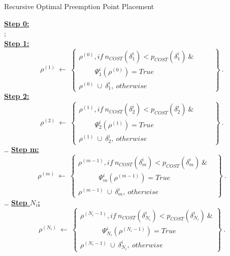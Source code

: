 \begin{algorithm}
\caption*{Recursive Optimal Preemption Point Placement}
\label{alg:recursive-optimal-ppp}
\begin{algorithmic}[0]
\State \textbf{\underline{Step 0:}}
\\
;
\\
\State \textbf{\underline{Step 1:}}
\begin{equation*}
\rho^{(1)}\ \gets\
\left\{
\begin{array}{l}
    \rho^{(0)}, if\ n_{COST}(\delta_{1}^{i}) < p_{COST}(\delta_{1}^{i})\ \&\ \ \ \ \ \ \ \ \ \ \ \\
    \ \ \ \ \ \ \ \ \ \ \Psi_{1}^{i}(\rho^{(0)}) = True\\
    \rho^{(0)}\ \cup\ \delta_{1}^{i},\ otherwise
\end{array}
\right\}~.
\end{equation*}
\State \textbf{\underline{Step 2:}}
\begin{equation*}
\rho^{(2)}\ \gets\
\left\{
\begin{array}{l}
    \rho^{(1)}, if\ n_{COST}(\delta_{2}^{i}) < p_{COST}(\delta_{2}^{i})\ \&\ \ \ \ \ \ \ \ \ \ \ \\
    \ \ \ \ \ \ \ \ \ \ \Psi_{2}^{i}(\rho^{(1)}) = True\\
    \rho^{(1)}\ \cup\ \delta_{2}^{i},\ otherwise
\end{array}
\right\}~.
\end{equation*}
\ldots
\State \textbf{\underline{Step m:}}
\begin{equation*}
\rho^{(m)}\ \gets\
\left\{
\begin{array}{l}
    \rho^{(m-1)}, if\ n_{COST}(\delta_{m}^{i}) < p_{COST}(\delta_{m}^{i})\ \&\ \ \ \ \\
    \ \ \ \ \ \ \ \ \ \ \ \ \ \Psi_{m}^{i}(\rho^{(m-1)}) = True\\
    \rho^{(m-1)}\ \cup\ \delta_{m}^{i},\ otherwise
\end{array}
\right\}~.
\end{equation*}
\ldots
\State \textbf{\underline{Step $N_{i}$:}}
\begin{equation*}
\rho^{(N_{i})}\ \gets\
\left\{
\begin{array}{l}
    \rho^{(N_{i}-1)}, if\ n_{COST}(\delta_{N_{i}}^{i}) < p_{COST}(\delta_{N_{i}}^{i})\ \&\\
    \ \ \ \ \ \ \ \ \ \ \ \ \ \ \Psi_{N_{i}}^{i}(\rho^{(N_{i}-1)}) = True\\
    \rho^{(N_{i}-1)}\ \cup\ \delta_{N_{i}}^{i},\ otherwise
\end{array}
\right\}~.
\end{equation*}
\end{algorithmic}
\end{algorithm}


